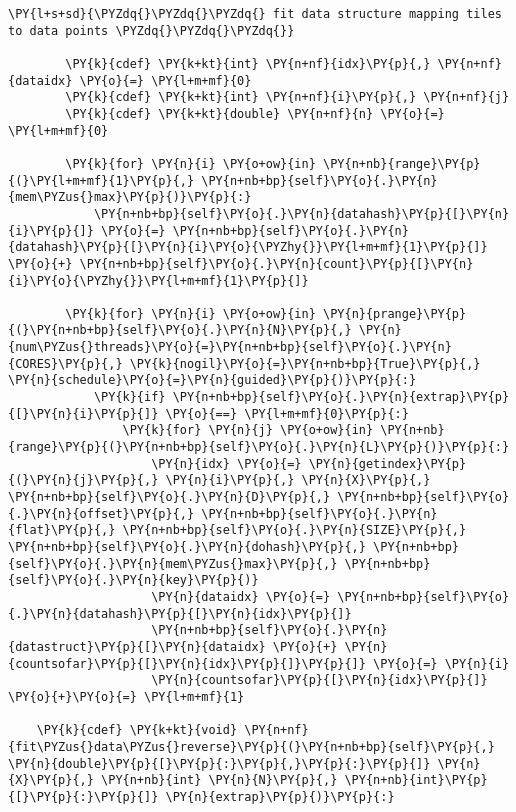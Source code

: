 \begin{Verbatim}[commandchars=\\\{\}]
        \PY{l+s+sd}{\PYZdq{}\PYZdq{}\PYZdq{} fit data structure mapping tiles to data points \PYZdq{}\PYZdq{}\PYZdq{}}

        \PY{k}{cdef} \PY{k+kt}{int} \PY{n+nf}{idx}\PY{p}{,} \PY{n+nf}{dataidx} \PY{o}{=} \PY{l+m+mf}{0}
        \PY{k}{cdef} \PY{k+kt}{int} \PY{n+nf}{i}\PY{p}{,} \PY{n+nf}{j}
        \PY{k}{cdef} \PY{k+kt}{double} \PY{n+nf}{n} \PY{o}{=} \PY{l+m+mf}{0}
        
        \PY{k}{for} \PY{n}{i} \PY{o+ow}{in} \PY{n+nb}{range}\PY{p}{(}\PY{l+m+mf}{1}\PY{p}{,} \PY{n+nb+bp}{self}\PY{o}{.}\PY{n}{mem\PYZus{}max}\PY{p}{)}\PY{p}{:}
            \PY{n+nb+bp}{self}\PY{o}{.}\PY{n}{datahash}\PY{p}{[}\PY{n}{i}\PY{p}{]} \PY{o}{=} \PY{n+nb+bp}{self}\PY{o}{.}\PY{n}{datahash}\PY{p}{[}\PY{n}{i}\PY{o}{\PYZhy{}}\PY{l+m+mf}{1}\PY{p}{]} \PY{o}{+} \PY{n+nb+bp}{self}\PY{o}{.}\PY{n}{count}\PY{p}{[}\PY{n}{i}\PY{o}{\PYZhy{}}\PY{l+m+mf}{1}\PY{p}{]} 

        \PY{k}{for} \PY{n}{i} \PY{o+ow}{in} \PY{n}{prange}\PY{p}{(}\PY{n+nb+bp}{self}\PY{o}{.}\PY{n}{N}\PY{p}{,} \PY{n}{num\PYZus{}threads}\PY{o}{=}\PY{n+nb+bp}{self}\PY{o}{.}\PY{n}{CORES}\PY{p}{,} \PY{k}{nogil}\PY{o}{=}\PY{n+nb+bp}{True}\PY{p}{,} \PY{n}{schedule}\PY{o}{=}\PY{n}{guided}\PY{p}{)}\PY{p}{:}
            \PY{k}{if} \PY{n+nb+bp}{self}\PY{o}{.}\PY{n}{extrap}\PY{p}{[}\PY{n}{i}\PY{p}{]} \PY{o}{==} \PY{l+m+mf}{0}\PY{p}{:}
                \PY{k}{for} \PY{n}{j} \PY{o+ow}{in} \PY{n+nb}{range}\PY{p}{(}\PY{n+nb+bp}{self}\PY{o}{.}\PY{n}{L}\PY{p}{)}\PY{p}{:}
                    \PY{n}{idx} \PY{o}{=} \PY{n}{getindex}\PY{p}{(}\PY{n}{j}\PY{p}{,} \PY{n}{i}\PY{p}{,} \PY{n}{X}\PY{p}{,} \PY{n+nb+bp}{self}\PY{o}{.}\PY{n}{D}\PY{p}{,} \PY{n+nb+bp}{self}\PY{o}{.}\PY{n}{offset}\PY{p}{,} \PY{n+nb+bp}{self}\PY{o}{.}\PY{n}{flat}\PY{p}{,} \PY{n+nb+bp}{self}\PY{o}{.}\PY{n}{SIZE}\PY{p}{,} \PY{n+nb+bp}{self}\PY{o}{.}\PY{n}{dohash}\PY{p}{,} \PY{n+nb+bp}{self}\PY{o}{.}\PY{n}{mem\PYZus{}max}\PY{p}{,} \PY{n+nb+bp}{self}\PY{o}{.}\PY{n}{key}\PY{p}{)}
                    \PY{n}{dataidx} \PY{o}{=} \PY{n+nb+bp}{self}\PY{o}{.}\PY{n}{datahash}\PY{p}{[}\PY{n}{idx}\PY{p}{]}
                    \PY{n+nb+bp}{self}\PY{o}{.}\PY{n}{datastruct}\PY{p}{[}\PY{n}{dataidx} \PY{o}{+} \PY{n}{countsofar}\PY{p}{[}\PY{n}{idx}\PY{p}{]}\PY{p}{]} \PY{o}{=} \PY{n}{i}
                    \PY{n}{countsofar}\PY{p}{[}\PY{n}{idx}\PY{p}{]} \PY{o}{+}\PY{o}{=} \PY{l+m+mf}{1}
        
    \PY{k}{cdef} \PY{k+kt}{void} \PY{n+nf}{fit\PYZus{}data\PYZus{}reverse}\PY{p}{(}\PY{n+nb+bp}{self}\PY{p}{,} \PY{n}{double}\PY{p}{[}\PY{p}{:}\PY{p}{,}\PY{p}{:}\PY{p}{]} \PY{n}{X}\PY{p}{,} \PY{n+nb}{int} \PY{n}{N}\PY{p}{,} \PY{n+nb}{int}\PY{p}{[}\PY{p}{:}\PY{p}{]} \PY{n}{extrap}\PY{p}{)}\PY{p}{:}


\end{Verbatim}
